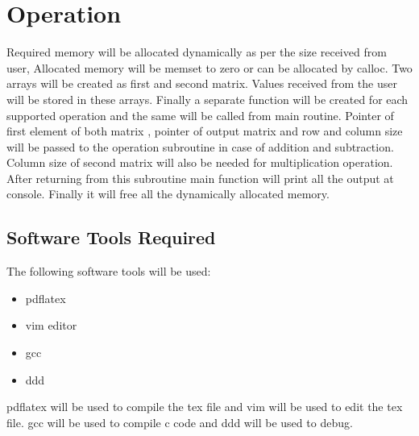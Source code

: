 \documentclass[a4paper,10pt]{report} %
\begin{document}
  \chapter{Operation}
  Required memory will be allocated dynamically as per the size received from user,
  Allocated memory will be memset to zero or can be allocated by calloc.
      \newline
  Two arrays will be created as first and second matrix. Values received
  from the user will be stored in these arrays.
      \newline
  Finally a separate function will be created for each supported
  operation and the same will be called from main routine. Pointer of
  first element of both matrix , pointer of output matrix and row and column
  size will be passed to the operation subroutine in case of addition and subtraction.
  Column size of second matrix will also be needed for multiplication
  operation.
      \newline
  After returning from this subroutine main function will print
  all the output at console.
      \newline
  Finally it will free all the dynamically allocated memory.

    \section{Software Tools Required}
    The following software tools will be used:
    \begin{itemize}
    \item pdflatex
    \item vim editor
    \item gcc
    \item ddd
    \end{itemize}
    pdflatex will be used to compile the tex file and vim will be used to edit
    the tex file.
    gcc will be used to compile c code and ddd will be used to debug.
    
\end{document}
